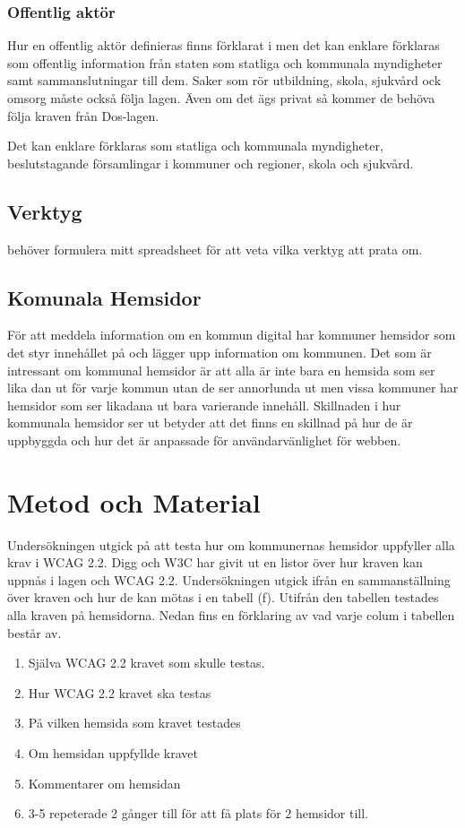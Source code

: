 \documentclass[11p]{article}
\begin{document}
    \subsubsection{Offentlig aktör}
    Hur en offentlig aktör definieras finns förklarat i \textcite{Dos-lagen} men det kan enklare förklaras som offentlig information från staten som statliga och kommunala myndigheter samt sammanslutningar till dem.
    Saker som rör utbildning, skola, sjukvård ock omsorg måste också följa lagen.
    Även om det ägs privat så kommer de behöva följa kraven från Dos-lagen.

    Det kan enklare förklaras som statliga och kommunala myndigheter, beslutstagande församlingar i kommuner och regioner, skola och sjukvård.\parencite{Om_Dos-lage}


    \subsection{Verktyg}
    behöver formulera mitt spreadsheet för att veta vilka verktyg att prata om.

    \subsection{Komunala Hemsidor}
    För att meddela information om en kommun digital har kommuner hemsidor som det styr innehållet på och lägger upp information om kommunen.
    Det som är intressant om kommunal hemsidor är att alla är inte bara en hemsida som ser lika dan ut för varje kommun utan de ser annorlunda ut men vissa kommuner har hemsidor som ser likadana ut bara varierande innehåll.
    Skillnaden i hur kommunala hemsidor ser ut betyder att det finns en skillnad på hur de är uppbyggda och hur det är anpassade för användarvänlighet för webben.


    
    \section{Metod och Material}

    Undersökningen utgick på att testa hur om kommunernas hemsidor uppfyller alla krav i WCAG 2.2.
    Digg och W3C har givit ut en listor över hur kraven kan uppnås i lagen och WCAG 2.2.
    Undersökningen utgick ifrån en sammanställning över kraven och hur de kan mötas i en tabell (f).
    Utifrån den tabellen testades alla kraven på hemsidorna.
    Nedan fins en förklaring av vad varje colum i tabellen består av.
    \begin{enumerate}
        \item Själva WCAG 2.2 kravet som skulle testas.
        \item Hur WCAG 2.2 kravet ska testas
        \item På vilken hemsida som kravet testades
        \item Om hemsidan uppfyllde kravet
        \item Kommentarer om hemsidan
        \item 3-5 repeterade 2 gånger till för att få plats för 2 hemsidor till.
    \end{enumerate}
\end{document}
